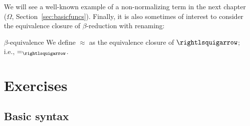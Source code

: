 We will see a well-known example of a non-normalizing term in the next
chapter ($\Omega$, Section~\ref{sec:basicfuncs}).  Finally, it is also
sometimes of interest to consider the equivalence closure of
$\beta$-reduction with renaming:

\begin{definition}{$\beta$-equivalence}
  We define $\approx$ as the equivalence closure of $\curva$; i.e., $=_{\curva}$.
  \end{definition}

\section{Exercises}

\subsection{Basic syntax}

